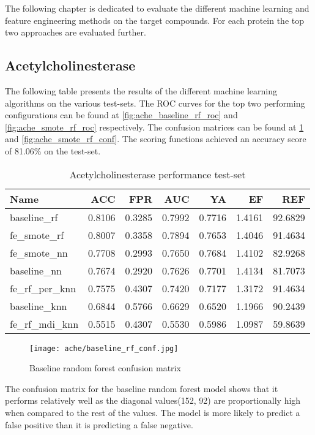 \label{cha:performance_protein}
The following chapter is dedicated to evaluate the different machine learning and feature engineering methods on
the target compounds. For each protein the top two approaches are evaluated further.

\subsection{Acetylcholinesterase}
The following table presents the results of the different machine learning algorithms on the various
test-sets. The ROC curves for the top two performing configurations can be found at \ref{fig:ache_baseline_rf_roc} and \ref{fig:ache_smote_rf_roc}
respectively. The confusion matrices can be found at \ref{fig:ache_baseline_rf_conf} and \ref{fig:ache_smote_rf_conf}.
The scoring functions achieved an accuracy score of 81.06\% on the test-set.
\begin{table}[H]
    \begin{center}
        \caption{Acetylcholinesterase performance test-set}
        \begin{tabular}{lrrrrrr}
            \toprule
            Name             & ACC    & FPR    & AUC    & YA     & EF     & REF     \\
            \midrule
            baseline\_rf     & 0.8106 & 0.3285 & 0.7992 & 0.7716 & 1.4161 & 92.6829 \\
            fe\_smote\_rf    & 0.8007 & 0.3358 & 0.7894 & 0.7653 & 1.4046 & 91.4634 \\
            fe\_smote\_nn    & 0.7708 & 0.2993 & 0.7650 & 0.7684 & 1.4102 & 82.9268 \\
            baseline\_nn     & 0.7674 & 0.2920 & 0.7626 & 0.7701 & 1.4134 & 81.7073 \\
            fe\_rf\_per\_knn & 0.7575 & 0.4307 & 0.7420 & 0.7177 & 1.3172 & 91.4634 \\
            baseline\_knn    & 0.6844 & 0.5766 & 0.6629 & 0.6520 & 1.1966 & 90.2439 \\
            fe\_rf\_mdi\_knn & 0.5515 & 0.4307 & 0.5530 & 0.5986 & 1.0987 & 59.8639 \\
            \bottomrule
        \end{tabular}
    \end{center}
\end{table}

\begin{figure}[H]
    \begin{center}
        \caption[]{Baseline random forest confusion matrix}
        \label{fig:ache_baseline_rf_conf}
        \texttt{[image: ache/baseline\_rf\_conf.jpg]}
    \end{center}
\end{figure}
The confusion matrix for the baseline random forest model shows that it performs relatively well as the diagonal values(152, 92) are proportionally high
when compared to the rest of the values. The model is more likely to predict a false positive than it is predicting a false negative.

